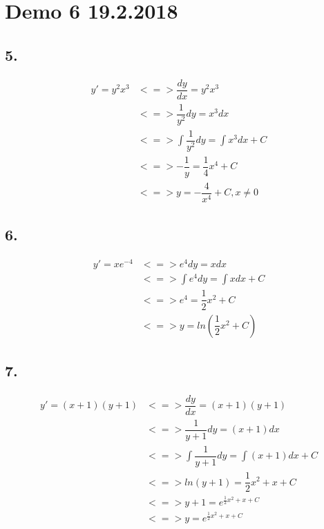 \section*{Demo 6 19.2.2018}


\subsection*{5.}
\begin{center}
\begin{align*}
	y' = y^2 x^3 &<=> \dfrac{dy}{dx} = y^2 x^3 \\
				&<=> \dfrac{1}{y^2} dy = x^3 dx \\
				&<=> \int \dfrac{1}{y^2} dy = \int x^3 dx + C \\
				&<=> - \dfrac{1}{y} = \dfrac{1}{4} x^4 + C \\
				&<=> y = - \dfrac{4}{x^4} + C , x \neq 0
\end{align*}
\end{center}


\subsection*{6.}
\begin{center}
\begin{align*}
	y' = xe^{-4} 	&<=> e^4 dy = x dx \\
					&<=> \int e^4 dy = \int xdx + C \\
					&<=> e^4 = \dfrac{1}{2}x^2 + C \\
					&<=> y = ln(\dfrac{1}{2}x^2 + C)
\end{align*}
\end{center}

\subsection*{7.}
\begin{center}
\begin{align*}
	y' = (x + 1)(y + 1) &<=> \dfrac{dy}{dx} = (x + 1)(y + 1) \\
						&<=> \dfrac{1}{y+1} dy = (x+1) dx \\
						&<=> \int \dfrac{1}{y+1}dy = \int (x+1) dx + C \\
						&<=> ln(y+1) = \dfrac{1}{2}x^2 + x + C \\
						&<=> y+1 = e^{\frac{1}{2} x^2 + x + C} \\
						&<=> y = e^{\frac{1}{2} x^2 + x + C}
\end{align*}
\end{center}